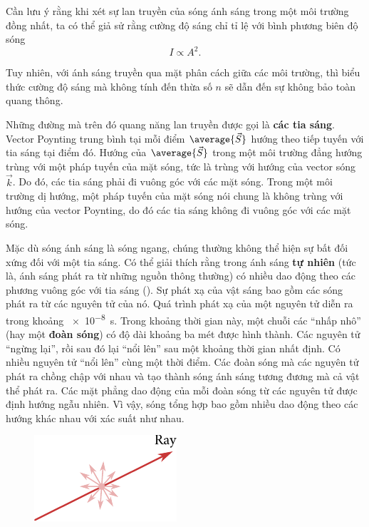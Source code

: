 Cần lưu ý rằng khi xét sự lan truyền của sóng ánh sáng trong một môi trường đồng nhất, ta có thể giả sử rằng cường độ sáng chỉ tỉ lệ với bình phương biên độ sóng
\begin{equation}\label{eq:16_10}
    I \propto A^2.
\end{equation}

\noindent
Tuy nhiên, với ánh sáng truyền qua mặt phân cách giữa các môi trường, thì biểu thức cường độ sáng mà không tính đến thừa số $n$ sẽ dẫn đến sự không bảo toàn quang thông.

Những đường mà trên đó quang năng lan truyền được gọi là \textbf{các tia sáng}.
Vector Poynting trung bình tại mỗi điểm $\average{\vec{S}}$ hướng theo tiếp tuyến với tia sáng tại điểm đó.
Hướng của $\average{\vec{S}}$ trong một môi trường đẳng hướng trùng với một pháp tuyến của mặt sóng, tức là trùng với hướng của vector sóng $\vec{k}$.
Do đó, các tia sáng phải đi vuông góc với các mặt sóng.
Trong một môi trường dị hướng, một pháp tuyến của mặt sóng nói chung là không trùng với hướng của vector Poynting, do đó các tia sáng không đi vuông góc với các mặt sóng.

Mặc dù sóng ánh sáng là sóng ngang, chúng thường không thể hiện sự bất đối xứng đối với một tia sáng.
Có thể giải thích rằng trong ánh sáng \textbf{tự nhiên} (tức là, ánh sáng phát ra từ những nguồn thông thường) có nhiều dao động theo các phương vuông góc với tia sáng ().
Sự phát xạ của vật sáng bao gồm các sóng phát ra từ các nguyên tử của nó.
Quá trình phát xạ của một nguyên tử diễn ra trong khoảng \SI{e-8}{\second}.
Trong khoảng thời gian này, một chuỗi các ``nhấp nhô'' (hay một \textbf{đoàn sóng}) có độ dài khoảng ba mét được hình thành.
Các nguyên tử ``ngừng lại'', rồi sau đó lại ``nổi lên'' sau một khoảng thời gian nhất định.
Có nhiều nguyên tử ``nổi lên'' cùng một thời điểm.
Các đoàn sóng mà các nguyên tử phát ra chồng chập với nhau và tạo thành sóng ánh sáng tương đương mà cả vật thể phát ra.
Các mặt phẳng dao động của mỗi đoàn sóng từ các nguyên tử được định hướng ngẫu nhiên.
Vì vậy, sóng tổng hợp bao gồm nhiều dao động theo các hướng khác nhau với xác suất như nhau.

\begin{figure}[!htb]
	\begin{center}
		\includegraphics[scale=1]{figures/ch_16/fig_16_1.pdf}
		\caption[]{}
		\label{fig:16_1}
	\end{center}
	\vspace{-0.8cm}
\end{figure}

